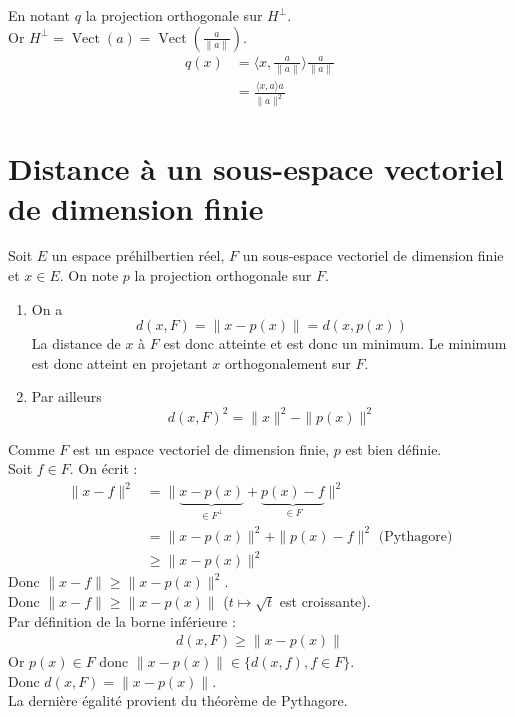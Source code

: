 \documentclass[../main.tex]{subfiles}
\begin{document}
\noindent En notant $q$ la projection orthogonale sur $H^\bot$. \\
Or $H^\bot = \operatorname{Vect}(a) = \operatorname{Vect}\left(\frac{a}{\|a\|}\right)$. 
\begin{align*}
    q(x) &= \langle x, \frac{a}{\|a\|}\rangle \frac{a}{\|a\|} \\
    &= \frac{\langle x, a\rangle a}{\|a\|^2}
\end{align*}

\section{Distance à un sous-espace vectoriel de dimension finie}
\begin{tcolorbox}[title=Théorème 34.53, title filled=false, colframe=orange, colback=orange!10!white]
    Soit $E$ un espace préhilbertien réel, $F$ un sous-espace vectoriel de dimension finie et $x \in E$. On note $p$ la projection orthogonale sur $F$.
    \begin{enumerate}
        \item On a
        $$d(x, F)=\|x-p(x)\|=d(x, p(x))$$
        La distance de $x$ à $F$ est donc atteinte et est donc un minimum. Le minimum est donc atteint en projetant $x$ orthogonalement sur $F$.
        \item Par ailleurs
        $$d(x, F)^2=\|x\|^2-\|p(x)\|^2$$
    \end{enumerate}
\end{tcolorbox}

\noindent Comme $F$ est un espace vectoriel de dimension finie, $p$ est bien définie. \\
Soit $f\in F$. On écrit : 
\begin{align*}
    \|x - f\|^2 &= \|\underbrace{x - p(x)}_{\in F^\bot} + \underbrace{p(x) - f}_{\in F}\|^2 \\
    &= \|x - p(x)\|^2 + \|p(x) - f\|^2 \text{ (Pythagore)} \\
    &\geq\|x - p(x)\|^2
\end{align*}
Donc $\|x - f\| \geq \|x - p(x)\|^2$. \\
Donc $\|x - f\|\geq \|x - p(x)\|$ ($t\mapsto\sqrt{t}$ est croissante). \\
Par définition de la borne inférieure : 
\begin{align*}
    d(x, F) \geq \|x - p(x)\|
\end{align*}
Or $p(x)\in F$ donc $\|x - p(x)\|\in \{d(x, f), f\in F\}$. \\
Donc $d(x, F) = \|x - p(x)\|$. \\
La dernière égalité provient du théorème de Pythagore. 
\end{document}

